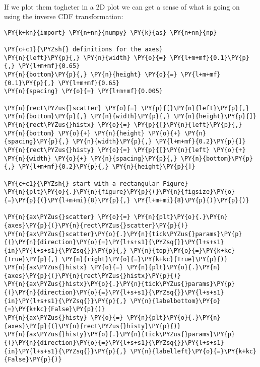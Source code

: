     \begin{center}
    \end{center}
    { \hspace*{\fill} \\}
    
    If we plot them togheter in a 2D plot we can get a sense of what is
going on using the inverse CDF transformation:

    \begin{tcolorbox}[breakable, size=fbox, boxrule=1pt, pad at break*=1mm,colback=cellbackground, colframe=cellborder]
\begin{Verbatim}[commandchars=\\\{\}]
\PY{k+kn}{import} \PY{n+nn}{numpy} \PY{k}{as} \PY{n+nn}{np}

\PY{c+c1}{\PYZsh{} definitions for the axes}
\PY{n}{left}\PY{p}{,} \PY{n}{width} \PY{o}{=} \PY{l+m+mf}{0.1}\PY{p}{,} \PY{l+m+mf}{0.65}
\PY{n}{bottom}\PY{p}{,} \PY{n}{height} \PY{o}{=} \PY{l+m+mf}{0.1}\PY{p}{,} \PY{l+m+mf}{0.65}
\PY{n}{spacing} \PY{o}{=} \PY{l+m+mf}{0.005}

\PY{n}{rect\PYZus{}scatter} \PY{o}{=} \PY{p}{[}\PY{n}{left}\PY{p}{,} \PY{n}{bottom}\PY{p}{,} \PY{n}{width}\PY{p}{,} \PY{n}{height}\PY{p}{]}
\PY{n}{rect\PYZus{}histx} \PY{o}{=} \PY{p}{[}\PY{n}{left}\PY{p}{,} \PY{n}{bottom} \PY{o}{+} \PY{n}{height} \PY{o}{+} \PY{n}{spacing}\PY{p}{,} \PY{n}{width}\PY{p}{,} \PY{l+m+mf}{0.2}\PY{p}{]}
\PY{n}{rect\PYZus{}histy} \PY{o}{=} \PY{p}{[}\PY{n}{left} \PY{o}{+} \PY{n}{width} \PY{o}{+} \PY{n}{spacing}\PY{p}{,} \PY{n}{bottom}\PY{p}{,} \PY{l+m+mf}{0.2}\PY{p}{,} \PY{n}{height}\PY{p}{]}

\PY{c+c1}{\PYZsh{} start with a rectangular Figure}
\PY{n}{plt}\PY{o}{.}\PY{n}{figure}\PY{p}{(}\PY{n}{figsize}\PY{o}{=}\PY{p}{(}\PY{l+m+mi}{8}\PY{p}{,} \PY{l+m+mi}{8}\PY{p}{)}\PY{p}{)}

\PY{n}{ax\PYZus{}scatter} \PY{o}{=} \PY{n}{plt}\PY{o}{.}\PY{n}{axes}\PY{p}{(}\PY{n}{rect\PYZus{}scatter}\PY{p}{)}
\PY{n}{ax\PYZus{}scatter}\PY{o}{.}\PY{n}{tick\PYZus{}params}\PY{p}{(}\PY{n}{direction}\PY{o}{=}\PY{l+s+s1}{\PYZsq{}}\PY{l+s+s1}{in}\PY{l+s+s1}{\PYZsq{}}\PY{p}{,} \PY{n}{top}\PY{o}{=}\PY{k+kc}{True}\PY{p}{,} \PY{n}{right}\PY{o}{=}\PY{k+kc}{True}\PY{p}{)}
\PY{n}{ax\PYZus{}histx} \PY{o}{=} \PY{n}{plt}\PY{o}{.}\PY{n}{axes}\PY{p}{(}\PY{n}{rect\PYZus{}histx}\PY{p}{)}
\PY{n}{ax\PYZus{}histx}\PY{o}{.}\PY{n}{tick\PYZus{}params}\PY{p}{(}\PY{n}{direction}\PY{o}{=}\PY{l+s+s1}{\PYZsq{}}\PY{l+s+s1}{in}\PY{l+s+s1}{\PYZsq{}}\PY{p}{,} \PY{n}{labelbottom}\PY{o}{=}\PY{k+kc}{False}\PY{p}{)}
\PY{n}{ax\PYZus{}histy} \PY{o}{=} \PY{n}{plt}\PY{o}{.}\PY{n}{axes}\PY{p}{(}\PY{n}{rect\PYZus{}histy}\PY{p}{)}
\PY{n}{ax\PYZus{}histy}\PY{o}{.}\PY{n}{tick\PYZus{}params}\PY{p}{(}\PY{n}{direction}\PY{o}{=}\PY{l+s+s1}{\PYZsq{}}\PY{l+s+s1}{in}\PY{l+s+s1}{\PYZsq{}}\PY{p}{,} \PY{n}{labelleft}\PY{o}{=}\PY{k+kc}{False}\PY{p}{)}


\end{Verbatim}
\end{tcolorbox}
